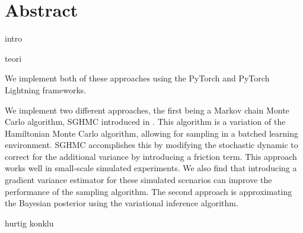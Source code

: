 \section*{Abstract}

intro

teori

We implement both of these approaches using the PyTorch and PyTorch Lightning frameworks.

We implement two different approaches, the first being a Markov chain Monte Carlo algorithm, SGHMC introduced in \cite*{chen_stochastic_2014}.
This algorithm is a variation of the Hamiltonian Monte Carlo algorithm, allowing for sampling in a batched learning environment.
SGHMC accomplishes this by modifying the stochastic dynamic to correct for the additional variance by introducing a friction term. 
This approach works well in small-scale simulated experiments. 
We also find that introducing a gradient variance estimator for these simulated scenarios can improve the performance of the sampling algorithm.
The second approach is approximating the Bayesian posterior using the variational inference algorithm.

hurtig konklu






